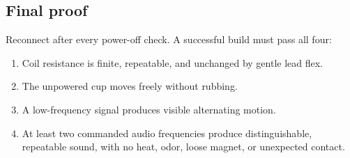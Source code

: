{\subsection{Final proof}
Reconnect after every power-off check. A successful build must pass all four:
\begin{enumerate}[label=\(\circ\),leftmargin=1.8em]
  \item Coil resistance is finite, repeatable, and unchanged by gentle lead flex.
  \item The unpowered cup moves freely without rubbing.
  \item A low-frequency signal produces visible alternating motion.
  \item At least two commanded audio frequencies produce distinguishable,
  repeatable sound, with no heat, odor, loose magnet, or unexpected contact.
\end{enumerate}}

\def\explanation{%
The amplifier supplies changing current. In the permanent magnet's field, the
coil experiences a force whose direction follows current direction. Because
the coil is attached to the cup, the cup moves air. Steady DC can make one
displacement and heating, but not a sustained tone. Loudness need not rise with
frequency: coil impedance, cup mass and stiffness, magnetic gap, resonances,
and the ear all shape the response. The measurements separate an electrical
claim (a continuous coil receives a changing signal) from mechanical evidence
(free, alternating motion) and acoustic evidence (repeatable sound).}

